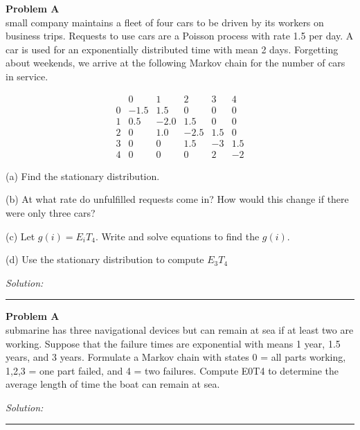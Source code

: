 \documentclass[a4paper, 11pt]{article}
\newenvironment{problem}[2][Problem]
    { \begin{mdframed}[backgroundcolor=gray!20] \textbf{#1 #2} \\}
    {  \end{mdframed}}
\newenvironment{solution}
    {\textit{Solution:}}
    {}
\begin{document}
\begin{problem}{4.29}
A small company maintains a fleet of four cars to be driven by its workers on business trips. Requests to use cars are a Poisson process with rate 1.5 per day. A car is used for an exponentially distributed time with mean 2 days. Forgetting about weekends, we arrive at the following Markov chain for the number of cars in service.

$$
\begin{array}{cccccc} 
& 0 & 1 & 2 & 3 & 4 \\
0 & -1.5 & 1.5 & 0 & 0 & 0 \\
1 & 0.5 & -2.0 & 1.5 & 0 & 0 \\
2 & 0 & 1.0 & -2.5 & 1.5 & 0 \\
3 & 0 & 0 & 1.5 & -3 & 1.5 \\
4 & 0 & 0 & 0 & 2 & -2
\end{array}
$$

(a) Find the stationary distribution. 

(b) At what rate do unfulfilled requests come in? How would this change if there were only three cars?

(c) Let $g(i)=E_{i} T_{4} .$ Write and solve equations to find the $g(i) .$ 

(d) Use the stationary distribution to compute $E_{3} T_{4}$

\end{problem}
\begin{solution}

\end{solution} 
%
\noindent\rule{7in}{2.8pt}

\begin{problem}{4.30}
A submarine has three navigational devices but can remain at sea if at least two are working. Suppose that the failure times are exponential with means 1 year, 1.5 years, and 3 years. Formulate a Markov chain with states 0 = all parts working, 1,2,3 = one part failed, and 4 = two failures. Compute E0T4 to determine the average length of time the boat can remain at sea.
\end{problem}
\begin{solution}

\end{solution} 
%
\noindent\rule{7in}{2.8pt}
\end{document}
